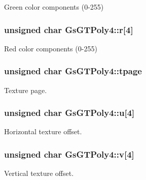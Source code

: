 Green color components (0-\/255) 

\hypertarget{structGsGTPoly4_a9982197b865cb32188c6ea8f581ebbe2}{}
\subsubsection[{r}]{\setlength{\rightskip}{0pt plus 5cm}unsigned char Gs\+G\+T\+Poly4\+::r\mbox{[}4\mbox{]}}\label{structGsGTPoly4_a9982197b865cb32188c6ea8f581ebbe2}


Red color components (0-\/255) 

\hypertarget{structGsGTPoly4_a0fde3cb26a7c8c26a7c75861bfe36193}{}
\subsubsection[{tpage}]{\setlength{\rightskip}{0pt plus 5cm}unsigned char Gs\+G\+T\+Poly4\+::tpage}\label{structGsGTPoly4_a0fde3cb26a7c8c26a7c75861bfe36193}


Texture page. 

\hypertarget{structGsGTPoly4_a7b5a20a8abed2cedd22cc8e0d6a2c3ea}{}
\subsubsection[{u}]{\setlength{\rightskip}{0pt plus 5cm}unsigned char Gs\+G\+T\+Poly4\+::u\mbox{[}4\mbox{]}}\label{structGsGTPoly4_a7b5a20a8abed2cedd22cc8e0d6a2c3ea}


Horizontal texture offset. 

\hypertarget{structGsGTPoly4_a3cc6edf56ae16106f1abffbf56abced9}{}
\subsubsection[{v}]{\setlength{\rightskip}{0pt plus 5cm}unsigned char Gs\+G\+T\+Poly4\+::v\mbox{[}4\mbox{]}}\label{structGsGTPoly4_a3cc6edf56ae16106f1abffbf56abced9}


Vertical texture offset. 

\hypertarget{structGsGTPoly4_ae9d7d0c778bc80e6e689dad2ccae3fe3}{}
